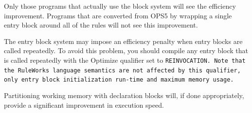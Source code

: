 Only those programs that actually use the block system will see the
efficiency improvement. Programs that are converted from OPS5 by
wrapping a single entry block around all of the rules will not see
this improvement.

The entry block system may impose an efficiency penalty when entry
blocks are called repeatedly. To avoid this problem, you should
compile any entry block that is called repeatedly with the Optimize
qualifier set to \tt{REINVOCATION}. Note that the RuleWorks language
semantics are not affected by this qualifier, only entry block
initialization run-time and maximum memory usage.

Partitioning working memory with declaration blocks will, if done
appropriately, provide a significant improvement in execution speed.

